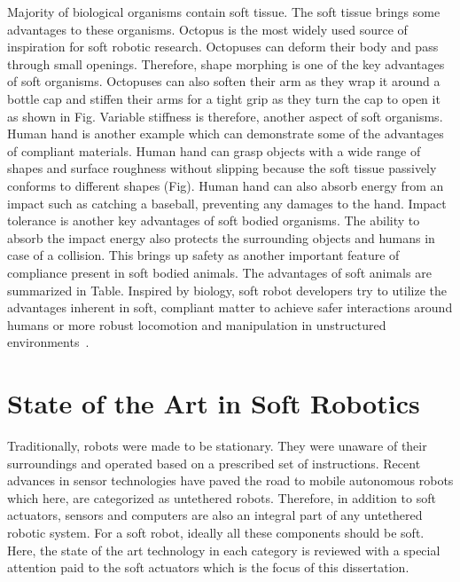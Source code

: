 Majority of biological organisms contain soft tissue. The soft tissue brings some advantages to these organisms. Octopus is the most widely used source of inspiration for soft robotic research. Octopuses can deform their body and pass through small openings. Therefore, shape morphing is one of the key advantages of soft organisms. Octopuses can also soften their arm as they wrap it around a bottle cap and stiffen their arms for a tight grip as they turn the cap to open it as shown in Fig. Variable stiffness is therefore, another aspect of soft organisms. Human hand is another example which can demonstrate some of the advantages of compliant materials. Human hand can grasp objects with a wide range of shapes and surface roughness without slipping because the soft tissue passively conforms to different shapes (Fig). Human hand can also absorb energy from an impact such as catching a baseball, preventing any damages to the hand. Impact tolerance is another key advantages of soft bodied organisms. The ability to absorb the impact energy also protects the surrounding objects and humans in case of a collision. This brings up safety as another important feature of compliance present in soft bodied animals. The advantages of soft animals are summarized in Table. Inspired by biology, soft robot developers try to utilize the advantages inherent in soft, compliant matter to achieve safer interactions around humans or more robust locomotion and manipulation in unstructured environments~\cite{martinez2013robotic,laschi2012soft,tolley2014resilient,bilodeau2015monolithic}.

\section{State of the Art in Soft Robotics}
Traditionally, robots were made to be stationary. They were unaware of their surroundings and operated based on a prescribed set of instructions. Recent advances in sensor technologies have paved the road to mobile autonomous robots which here, are categorized as untethered robots. Therefore, in addition to soft actuators, sensors and computers are also an integral part of any untethered robotic system. For a soft robot, ideally all these components should be soft. Here, the state of the art technology in each category is reviewed with a special attention paid to the soft actuators which is the focus of this dissertation. 
